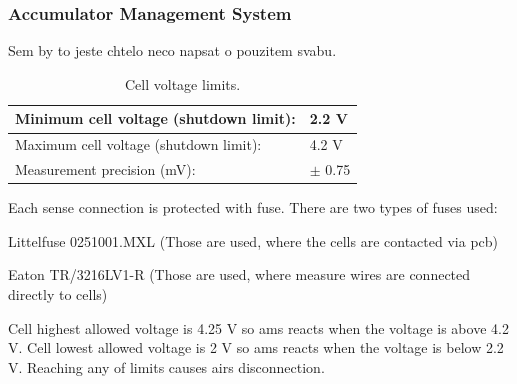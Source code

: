 \subsubsection{Accumulator Management System}

Sem by to jeste chtelo neco napsat o pouzitem svabu.

\begin{table}[H]
	\centering
	\caption{Cell voltage limits.}
	\begin{tabularx}{\textwidth}{|X|X|}
		\hline
		Minimum cell voltage (shutdown limit): & 2.2 V \\[\TableSize]
		\hline
		Maximum cell voltage (shutdown limit): & 4.2 V \\[\TableSize]
		\hline
		Measurement precision (mV): & $\pm$ 0.75 \\[\TableSize]
		\hline
	\end{tabularx}%
	\label{tab:acc-limits}%
\end{table}%


Each sense connection is protected with fuse. There are two types of fuses used: 

\noindent Littelfuse 0251001.MXL (Those are used, where the cells are contacted via \gls{pcb})

\noindent Eaton TR/3216LV1-R (Those are used, where measure wires are connected directly to cells)

Cell highest allowed voltage is 4.25 V so \gls{ams} reacts when the voltage is above 4.2 V. Cell lowest allowed voltage is 2 V so \gls{ams} reacts when the voltage is below 2.2 V. Reaching any of limits causes \glspl{air} disconnection.

